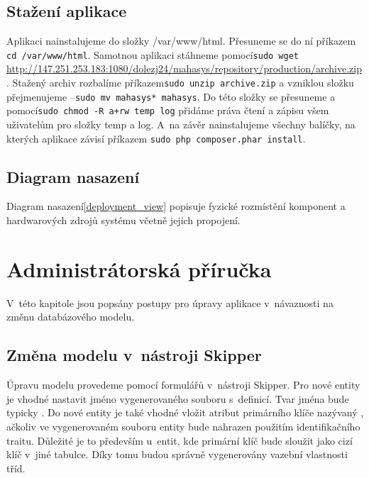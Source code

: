 \documentclass[thesis=B,czech]{FITthesis}[2012/06/26]
\begin{document}
\subsection{Stažení aplikace}
	Aplikaci nainstalujeme do složky /var/www/html. Přesuneme se do ní příkazem \verb|cd /var/www/html|. Samotnou aplikaci stáhneme pomocí\newline\verb|sudo wget | \url{http://147.251.253.183:1080/dolezj24/mahasys/repository/production/archive.zip}. Stažený archiv rozbalíme příkazem\newline\verb|sudo unzip archive.zip| a vzniklou složku přejmenujeme --\newline\verb|sudo mv mahasys* mahasys|. Do této složky se přesuneme a pomocí\newline\verb|sudo chmod -R a+rw temp log| přidáme práva čtení a zápisu všem uživatelům pro složky temp a log. A~na závěr nainstalujeme všechny balíčky, na kterých aplikace závisí příkazem \verb|sudo php composer.phar install|.
\subsection{Diagram nasazení}
	Diagram nasazení\ref{deployment_view} popisuje fyzické rozmístění komponent a hardwarových zdrojů systému včetně jejich propojení.\cite{si1_pred7}
	
\section{Administrátorská příručka}
	V~této kapitole jsou popsány postupy pro úpravy aplikace v~návaznosti na změnu databázového modelu.
\subsection{Změna modelu v~nástroji Skipper}
	Úpravu modelu provedeme pomocí formulářů v~nástroji Skipper. Pro nové entity je vhodné nastavit jméno vygenerovaného souboru s~definicí. Tvar jména bude typicky . Do nové entity je také vhodné vložit atribut primárního klíče nazývaný , ačkoliv ve vygenerovaném souboru entity bude nahrazen použitím identifikačního traitu. Důležité je to především u~entit, kde primární klíč bude sloužit jako cizí klíč v~jiné tabulce. Díky tomu budou správně vygenerovány vazební vlastnosti tříd.
\end{document}
